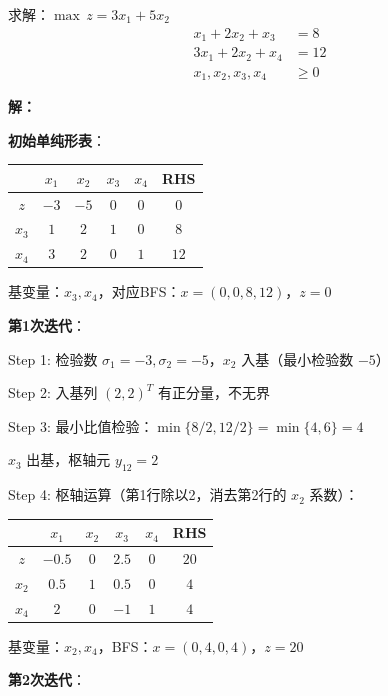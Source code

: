 \begin{example}[单纯形法完整求解]
求解：$\max \, z = 3x_1 + 5x_2$
\begin{align*}
x_1 + 2x_2 + x_3 &= 8 \\
3x_1 + 2x_2 + x_4 &= 12 \\
x_1, x_2, x_3, x_4 &\geq 0
\end{align*}

\textbf{解：}

\textbf{初始单纯形表}：

\begin{table}[H]
\centering
\begin{tabular}{@{}c|cccc|c@{}}
\toprule
& $x_1$ & $x_2$ & $x_3$ & $x_4$ & RHS \\
\midrule
$z$ & $-3$ & $-5$ & $0$ & $0$ & $0$ \\
\midrule
$x_3$ & $1$ & $2$ & $1$ & $0$ & $8$ \\
$x_4$ & $3$ & $2$ & $0$ & $1$ & $12$ \\
\bottomrule
\end{tabular}
\end{table}

基变量：$x_3, x_4$，对应BFS：$x = (0, 0, 8, 12)$，$z = 0$

\textbf{第1次迭代}：

Step 1: 检验数 $\sigma_1 = -3, \sigma_2 = -5$，$x_2$ 入基（最小检验数 $-5$）

Step 2: 入基列 $(2, 2)^T$ 有正分量，不无界

Step 3: 最小比值检验：$\min\{8/2, 12/2\} = \min\{4, 6\} = 4$

$x_3$ 出基，枢轴元 $y_{12} = 2$

Step 4: 枢轴运算（第1行除以2，消去第2行的 $x_2$ 系数）：

\begin{table}[H]
\centering
\begin{tabular}{@{}c|cccc|c@{}}
\toprule
& $x_1$ & $x_2$ & $x_3$ & $x_4$ & RHS \\
\midrule
$z$ & $-0.5$ & $0$ & $2.5$ & $0$ & $20$ \\
\midrule
$x_2$ & $0.5$ & $1$ & $0.5$ & $0$ & $4$ \\
$x_4$ & $2$ & $0$ & $-1$ & $1$ & $4$ \\
\bottomrule
\end{tabular}
\end{table}

基变量：$x_2, x_4$，BFS：$x = (0, 4, 0, 4)$，$z = 20$

\textbf{第2次迭代}：


\end{example}
